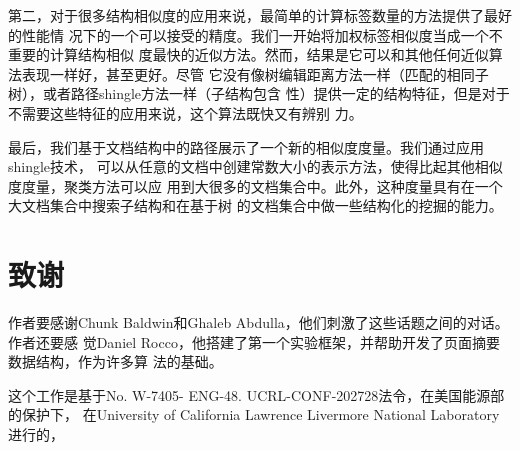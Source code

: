 第二，对于很多结构相似度的应用来说，最简单的计算标签数量的方法提供了最好的性能情
况下的一个可以接受的精度。我们一开始将加权标签相似度当成一个不重要的计算结构相似
度最快的近似方法。然而，结果是它可以和其他任何近似算法表现一样好，甚至更好。尽管
它没有像树编辑距离方法一样（匹配的相同子树），或者路径shingle方法一样（子结构包含
性）提供一定的结构特征，但是对于不需要这些特征的应用来说，这个算法既快又有辨别
力。

最后，我们基于文档结构中的路径展示了一个新的相似度度量。我们通过应用shingle技术，
可以从任意的文档中创建常数大小的表示方法，使得比起其他相似度度量，聚类方法可以应
用到大很多的文档集合中。此外，这种度量具有在一个大文档集合中搜索子结构和在基于树
的文档集合中做一些结构化的挖掘的能力。

\section*{致谢}
作者要感谢Chunk Baldwin和Ghaleb Abdulla，他们刺激了这些话题之间的对话。作者还要感
觉Daniel Rocco，他搭建了第一个实验框架，并帮助开发了页面摘要数据结构，作为许多算
法的基础。

这个工作是基于No. W-7405- ENG-48. UCRL-CONF-202728法令，在美国能源部的保护下，
在University of California Lawrence Livermore National Laboratory进行的，

